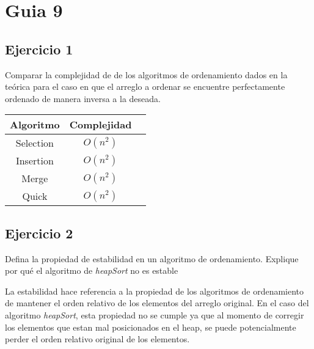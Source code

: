 





\maketitle
\newpage

\tableofcontents
\newpage

\section{Guia 9}

\subsection{Ejercicio 1}
Comparar la complejidad de de los algoritmos de ordenamiento dados en la teórica para el caso en que el arreglo a ordenar se encuentre perfectamente ordenado de manera inversa a la deseada.

\begin{center}
    \begin{tabular}{|c|c|l}
        \hline
        \textbf{Algoritmo} & \textbf{Complejidad} \\
        \hline
        Selection          & $O(n^2)$             \\
        \hline
        Insertion          & $O(n^2)$             \\
        \hline
        Merge              & $O(n^2)$             \\
        \hline
        Quick              & $O(n^2)$             \\
        \hline
    \end{tabular}
\end{center}

\subsection{Ejercicio 2}
Defina la propiedad de estabilidad en un algoritmo de ordenamiento. Explique por qué el algoritmo de \textit{heapSort} no es estable

La estabilidad hace referencia a la propiedad de los algoritmos de ordenamiento de mantener el orden relativo de los elementos del arreglo original. En el caso del algoritmo \textit{heapSort}, esta propiedad no se cumple ya que al momento de corregir los elementos que estan mal posicionados en el heap, se puede potencialmente perder el orden relativo original de los elementos.

